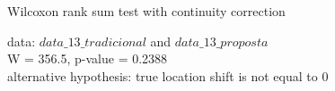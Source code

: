 Wilcoxon rank sum test with continuity correction

\noindent
data:  $data\_13\_tradicional$ and $data\_13\_proposta$\\
W = 356.5, p-value = 0.2388\\
alternative hypothesis: true location shift is not equal to 0
